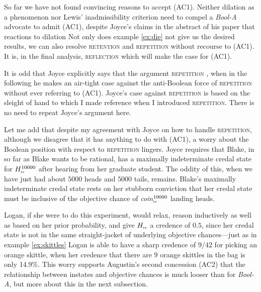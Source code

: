 \documentclass[11pt]{article}
\newcommand{\anderson}[0]{\textit{Bool-A}}
\begin{document}
So far we have not found convincing reasons to accept (AC1). Neither
dilation as a phenomenon nor Lewis' inadmissibility criterion need to
compel a {\anderson} advocate to admit (AC1), despite Joyce's claims
in the abstract of his paper that reactions to dilation  Not only does example
\ref{ex:die} not give us the desired results, we can also resolve
\textsc{retention} and \textsc{repetition} without recourse to (AC1).
It is, in the final analysis, \textsc{reflection} which will make the
case for (AC1).

It is odd that Joyce explicitly says that the argument
\textsc{repetition}  , when in the
following he makes an air-tight case against the anti-Boolean force of
\textsc{repetition} without ever referring to (AC1). Joyce's case
against \textsc{repetition} is based on the sleight of hand to which I
made reference when I introduced \textsc{repetition}. There is no need
to repeat Joyce's argument here.

Let me add that despite my agreement with Joyce on how to handle
\textsc{repetition}, although we disagree that it has anything to do
with (AC1), a worry about the Boolean position with respect to
\textsc{repetition} lingers. Joyce requires that Blake, in so far as
Blake wants to be rational, has a maximally indeterminate credal state
for $H^{10000}_{\mbox{\tiny{iv}}}$ after hearing from her graduate
student. The oddity of this, when we have just had about $5000$ heads
and $5000$ tails, remains. Blake's maximally indeterminate credal
state rests on her stubborn conviction that her credal state must be
inclusive of the objective chance of
\textit{coin}$^{10000}_{\mbox{\tiny{iv}}}$ landing heads.

Logan, if she were to do this experiment, would relax, reason
inductively as well as based on her prior probability, and give
$H_{\mbox{\tiny{iv}}}$ a credence of $0.5$, since her credal state is
not in the same straight-jacket of underlying objective chances---just
as in example \ref{ex:skittles} Logan is able to have a sharp credence
of $9/42$ for picking an orange skittle, when her credence that there
are $9$ orange skittles in the bag is only 14.9\%. This worry supports
Augustin's second concession (AC2) that the relationship between
instates and objective chances is much looser than for {\anderson},
but more about this in the next subsection.
\end{document}
